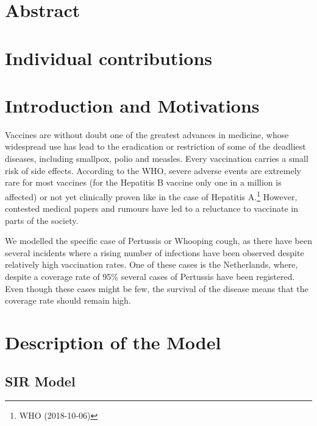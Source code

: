 \documentclass[11pt]{article}
\begin{document}

\tableofcontents

\newpage




\section{Abstract}



\section{Individual contributions}

\section{Introduction and Motivations}

Vaccines are without doubt one of the greatest advances in medicine, whose widespread use has lead to the eradication or restriction of some of the deadliest diseases, including smallpox, polio and measles. Every vaccination carries a small risk of side effects. According to the WHO, severe adverse events are extremely rare for most vaccines (for the Hepatitis B vaccine only one in a million is affected) or not yet clinically proven like in the case of Hepatitis A.\footnote{WHO (2018-10-06)}  However, contested medical papers and rumours have led to a reluctance to vaccinate in parts of the society.

\vspace{14px}

We modelled the specific case of Pertussis or Whooping cough, as there have been several incidents where a rising number of infections have been observed despite relatively high vaccination rates. One of these cases is the Netherlands, where, despite a coverage rate of 95\% several cases of Pertussis have been registered. Even though these cases might be few, the survival of the disease means that the coverage rate should remain high. 

\section{Description of the Model}

\subsection{SIR Model}
\end{document}
